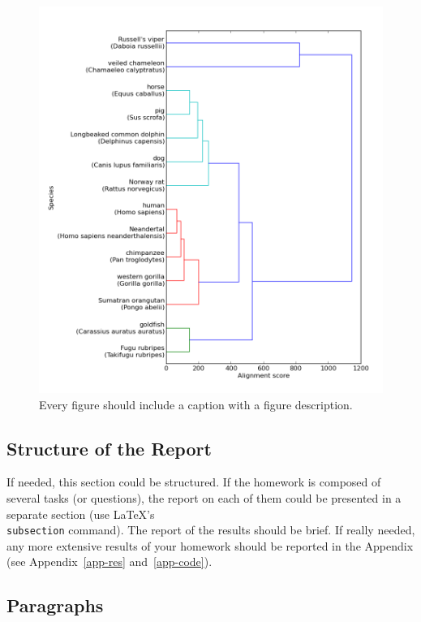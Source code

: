 \documentclass[a4paper,11pt]{article}
\begin{document}
\begin{figure}[htbp]
\begin{center}
\includegraphics[scale=0.7]{img/dendrogram-gap-11.png}
\caption{Every figure should include a caption with a figure description.}
\label{fig-example}
\end{center}
\end{figure}



\subsection{Structure of the Report}

If needed, this section could be structured. If the homework is composed of several tasks (or questions), the report on each of them could be presented in a separate section (use \LaTeX's {\tt \\subsection} command). The report of the results should be brief. If really needed, any  more extensive results of your homework should be reported in the Appendix (see Appendix~\ref{app-res} and~\ref{app-code}).

\subsection{Paragraphs}
\end{document}
